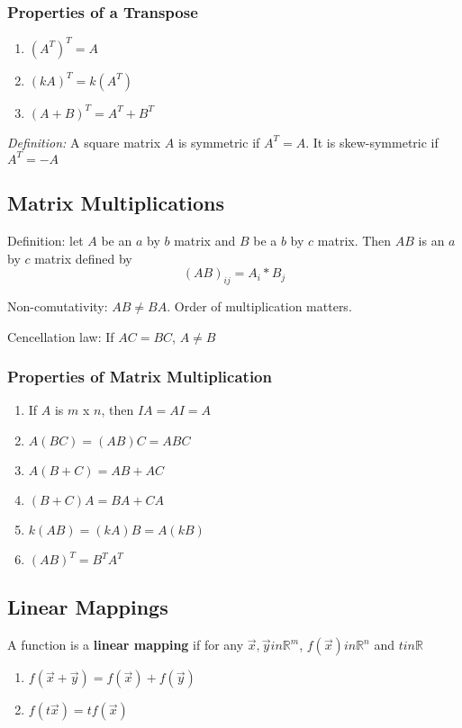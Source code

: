 \documentclass[12pt]{article}
\newcommand{\R}[1]{\mathbb{R}^{#1}}
\begin{document}
\subsubsection*{Properties of a Transpose}
\begin{enumerate}
\item $(A^T)^T = A$
\item $(kA)^T = k(A^T)$
\item $(A+B)^T = A^T + B^T$
\end{enumerate}

\textit{Definition:} A square matrix $A$ is symmetric if $A^T = A$. It is skew-symmetric if $A^T = -A$

\subsection*{Matrix Multiplications}
Definition: let $A$ be an $a$ by $b$ matrix and $B$ be a $b$ by $c$ matrix. Then $AB$ is an $a$ by $c$ matrix defined by \[ (AB)_{ij} = A_i * B_j \]

Non-comutativity: $AB \neq BA$. Order of multiplication matters.

Cencellation law: If $AC = BC$, $A \neq B$

\subsubsection*{Properties of Matrix Multiplication}
\begin{enumerate}
\item If $A$ is $m$ x $n$, then $IA = AI = A$
\item $A(BC) = (AB)C = ABC$
\item $A(B+C) = AB + AC$
\item $(B+C)A = BA + CA$
\item $k(AB) = (kA)B = A(kB)$
\item $(AB)^T = B^TA^T$
\end{enumerate}

\subsection*{Linear Mappings}
A function is a {\bf linear mapping} if for any $\vec{x}, \vec{y}in\R{m}$, $f(\vec{x})in\R{n}$ and $tin\mathbb{R}$
\begin{enumerate}
\item $f(\vec{x} + \vec{y}) = f(\vec{x}) + f(\vec{y})$
\item $f(t\vec{x}) = tf(\vec{x})$
\end{enumerate}
\end{document}
